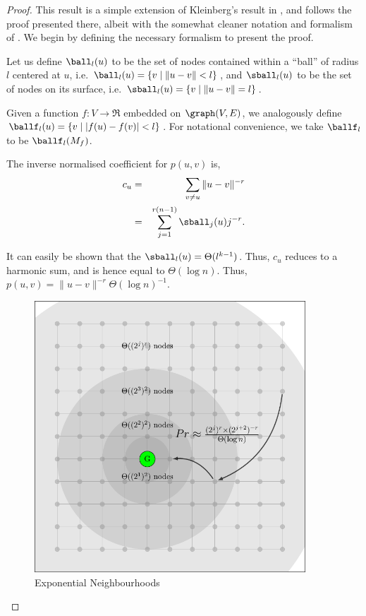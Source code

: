 \begin{proof}

This result is a simple extension of Kleinberg's result in
\cite{Kleinberg2000}, and follows the proof presented there, albeit with
the somewhat cleaner notation and formalism of \cite{Martel2004}. We
begin by defining the necessary formalism to present the proof.

\begin{definition}
Let us define $\ball_l(u)$ to be the set of nodes contained within
a ``ball'' of radius $l$ centered at $u$, i.e.  $\ball_l(u) = \{ v \mid
\|u - v\| < l \}$, and $\sball_l(u)$ to be the set of nodes on its
surface, i.e. $\sball_l(u) = \{ v \mid \|u - v\| = l \}$.

Given a function $f:V \to \Re$ embedded on $\graph(V,E)$, we analogously
define $\ballf_l(u) = \{ v \mid |f(u) - f(v)| < l \}$. For notational
convenience, we take $\ballf_l$ to be $\ballf_l(M_f)$.
\end{definition}

The inverse normalised coefficient for $p(u,v)$ is, 
\begin{eqnarray*}
    c_u &=& \sum_{v \ne u} \|u - v\|^{-r} \\
        &=& \sum_{j=1}^{r(n-1)} \sball_j(u) j^{-r}.
\end{eqnarray*}

It can easily be shown that the $\sball_l(u) = \Theta( l^{k-1} )$.
Thus, $c_u$ reduces to a harmonic sum, and is hence equal to $\Theta(
\log n )$. Thus, $p(u,v) = \|u - v\|^{-r} \Theta(\log n)^{-1}$.

\begin{figure}[tbh]
  \centering
    \includegraphics[width=4in]{figures/graph-proof}
    \caption{Exponential Neighbourhoods}
    \label{fig:graph-proof}
\end{figure}


\end{proof}
